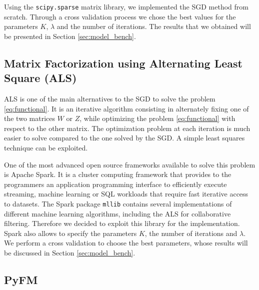 \documentclass[10pt,conference,compsocconf]{IEEEtran}
\begin{document}
Using the \texttt{scipy.sparse} matrix library, we implemented the SGD method from scratch.
Through a cross validation process we chose the best values for the parameters $K$, $\lambda$ and
the number of iterations. The results that we obtained will be presented in Section
\ref{sec:model_bench}.

\subsection{Matrix Factorization using Alternating Least Square (ALS)}
ALS is one of the main alternatives to the SGD to solve the problem \ref{eq:functional}.
It is an iterative algorithm consisting in alternately fixing one of the two matrices $W$ or $Z$,
while optimizing the problem \ref{eq:functional} with respect to the other matrix.
The optimization problem at each iteration is much easier to solve compared to the one solved by the
SGD. A simple least squares technique can be exploited.

One of the most advanced open source frameworks available to solve this problem is Apache Spark. It
is a cluster computing framework that provides to the programmers an application programming
interface to efficiently execute streaming, machine learning or SQL workloads that require fast
iterative access to datasets.
The Spark package \texttt{mllib} contains several implementations of different machine learning
algorithms, including the ALS for collaborative filtering. Therefore we decided to exploit this
library for the implementation.
Spark also allows to specify the parameters $K$, the number of iterations and $\lambda$. We perform a
cross validation to choose the best parameters, whose results will be discussed in Section 
\ref{sec:model_bench}.

\subsection{PyFM}

\end{document}
